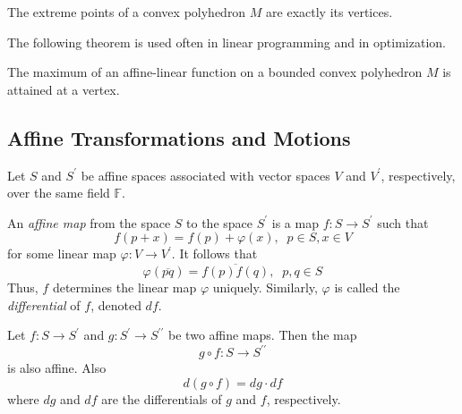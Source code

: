\documentclass{article}
\begin{document}
    \begin{proposition}
      The extreme points of a convex polyhedron $M$ are exactly its vertices. 
    \end{proposition}

    The following theorem is used often in linear programming and in optimization. 

    \begin{theorem}
      The maximum of an affine-linear function on a bounded convex polyhedron $M$ is attained at a vertex. 
    \end{theorem}

  \subsection{Affine Transformations and Motions}

    Let $S$ and $S^\prime$ be affine spaces associated with vector spaces $V$ and $V^\prime$, respectively, over the same field $\mathbb{F}$. 

    \begin{definition}
      An \textit{affine map} from the space $S$ to the space $S^\prime$ is a map $f: S \longrightarrow S^\prime$ such that
      \begin{equation}
        f(p+x) = f(p) + \varphi(x), \;\; p \in S, x \in V
      \end{equation}
      for some linear map $\varphi: V \longrightarrow V^\prime$. It follows that
      \begin{equation}
        \varphi(\overline{pq}) = \overline{f(p) f(q)}, \;\; p, q \in S
      \end{equation}
      Thus, $f$ determines the linear map $\varphi$ uniquely. Similarly, $\varphi$ is called the \textit{differential} of $f$, denoted $df$. 
    \end{definition}

    \begin{proposition}
      Let $f: S \longrightarrow S^\prime$ and $g: S^\prime \longrightarrow S^{\prime \prime}$ be two affine maps. Then the map
      \begin{equation}
        g \circ f : S \longrightarrow S^{\prime\prime}
      \end{equation}
      is also affine. Also
      \begin{equation}
        d(g \circ f) = dg \cdot df
      \end{equation}
      where $dg$ and $df$ are the differentials of $g$ and $f$, respectively. 
    \end{proposition}
\end{document}
